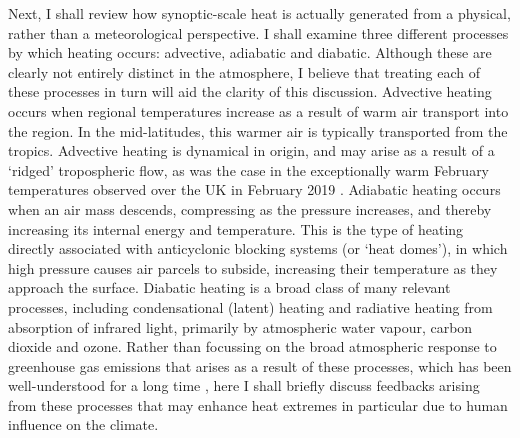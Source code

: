  Next, I shall review how synoptic-scale heat is actually generated from a physical, rather than a meteorological perspective. I shall examine three different processes by which heating occurs: advective, adiabatic and diabatic. Although these are clearly not entirely distinct in the atmosphere, I believe that treating each of these processes in turn will aid the clarity of this discussion. Advective heating occurs when regional temperatures increase as a result of warm air transport into the region. In the mid-latitudes, this warmer air is typically transported from the tropics. Advective heating is dynamical in origin, and may arise as a result of a `ridged' tropospheric flow, as was the case in the exceptionally warm February temperatures observed over the UK in February 2019 \citep{young_record-breaking_2020,leach_forecast-based_2021}. Adiabatic heating occurs when an air mass descends, compressing as the pressure increases, and thereby increasing its internal energy and temperature. This is the type of heating directly associated with anticyclonic blocking systems (or `heat domes'), in which high pressure causes air parcels to subside, increasing their temperature as they approach the surface. Diabatic heating is a broad class of many relevant processes, including condensational (latent) heating and radiative heating from absorption of infrared light, primarily by atmospheric water vapour, carbon dioxide and ozone. Rather than focussing on the broad atmospheric response to greenhouse gas emissions that arises as a result of these processes, which has been well-understood for a long time \citep{arrhenius_influence_1896}, here I shall briefly discuss feedbacks arising from these processes that may enhance heat extremes in particular due to human influence on the climate. %

